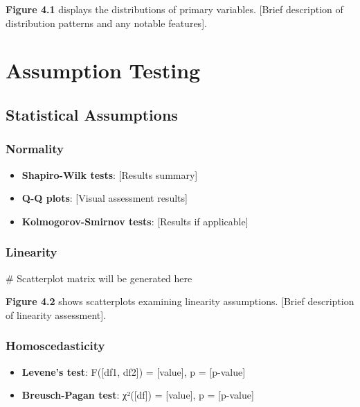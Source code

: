 \documentclass[
  12pt,
  letterpaper,
  12pt,
  letterpaper,
  oneside]{report}
\newenvironment{Shaded}{\begin{snugshade}}{\end{snugshade}}
\newcommand{\CommentTok}[1]{\textcolor[rgb]{0.37,0.37,0.37}{#1}}
\providecommand{\tightlist}{%
  \setlength{\itemsep}{0pt}\setlength{\parskip}{0pt}}
\begin{document}
\textbf{Figure 4.1} displays the distributions of primary variables.
{[}Brief description of distribution patterns and any notable
features{]}.

\section{Assumption Testing}\label{assumption-testing}

\subsection{Statistical Assumptions}\label{statistical-assumptions}

\subsubsection{Normality}\label{normality}

\begin{itemize}
\tightlist
\item
  \textbf{Shapiro-Wilk tests}: {[}Results summary{]}
\item
  \textbf{Q-Q plots}: {[}Visual assessment results{]}
\item
  \textbf{Kolmogorov-Smirnov tests}: {[}Results if applicable{]}
\end{itemize}

\subsubsection{Linearity}\label{linearity}

\begin{Shaded}
\begin{Highlighting}[]
\CommentTok{\# Scatterplot matrix will be generated here}
\end{Highlighting}
\end{Shaded}

\textbf{Figure 4.2} shows scatterplots examining linearity assumptions.
{[}Brief description of linearity assessment{]}.

\subsubsection{Homoscedasticity}\label{homoscedasticity}

\begin{itemize}
\tightlist
\item
  \textbf{Levene's test}: F({[}df1, df2{]}) = {[}value{]}, p =
  {[}p-value{]}
\item
  \textbf{Breusch-Pagan test}: χ²({[}df{]}) = {[}value{]}, p =
  {[}p-value{]}
\end{itemize}
\end{document}

